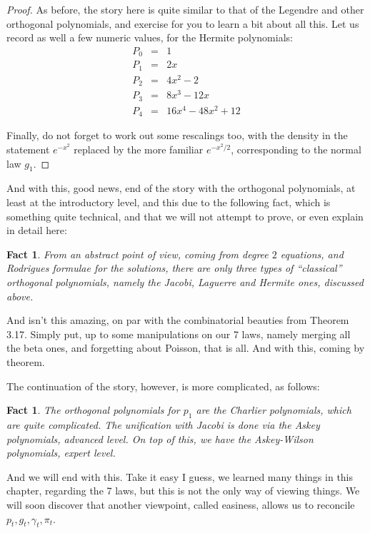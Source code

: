 \documentclass[12pt]{amsbook}
\newtheorem{fact}[theorem]{Fact}
\begin{document}
\begin{proof}
As before, the story here is quite similar to that of the Legendre and other orthogonal polynomials, and exercise for you to learn a bit about all this. Let us record as well a few numeric values, for the Hermite polynomials:
\begin{eqnarray*}
P_0&=&1\\
P_1&=&2x\\
P_2&=&4x^2-2\\
P_3&=&8x^3-12x\\
P_4&=&16x^4-48x^2+12
\end{eqnarray*}

Finally, do not forget to work out some rescalings too, with the density in the statement $e^{-x^2}$ replaced by the more familiar $e^{-x^2/2}$, corresponding to the normal law $g_1$.
\end{proof}

And with this, good news, end of the story with the orthogonal polynomials, at least at the  introductory level, and this due to the following fact, which is something quite technical, and that we will not attempt to prove, or even explain in detail here:

\begin{fact}
From an abstract point of view, coming from degree $2$ equations, and Rodrigues formulae for the solutions, there are only three types of ``classical'' orthogonal polynomials, namely the Jacobi, Laguerre and Hermite ones, discussed above.
\end{fact}

And isn't this amazing, on par with the combinatorial beauties from Theorem 3.17. Simply put, up to some manipulations on our 7 laws, namely merging all the beta ones, and forgetting about Poisson, that is all. And with this, coming by theorem.

\bigskip

The continuation of the story, however, is more complicated, as follows:


\begin{fact}
The orthogonal polynomials for $p_1$ are the Charlier polynomials, which are quite complicated. The unification with Jacobi is done via the Askey polynomials, advanced level. On top of this, we have the Askey-Wilson polynomials, expert level.
\end{fact}

And we will end with this. Take it easy I guess, we learned many things in this chapter, regarding the 7 laws, but this is not the only way of viewing things. We will soon discover that another viewpoint, called easiness, allows us to reconcile $p_t,g_t,\gamma_t,\pi_t$.
\end{document}
